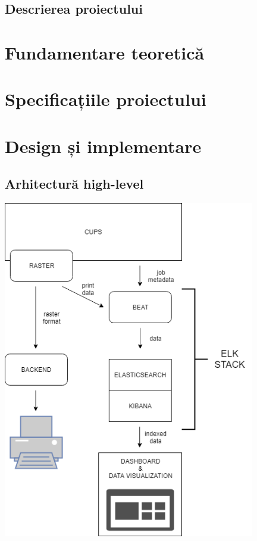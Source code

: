 \documentclass[12pt]{report}
\begin{document}
	\section{Descrierea proiectului}



\chapter{Fundamentare teoretică}


\chapter{Specificațiile proiectului}


\chapter{Design și implementare}

	\section{Arhitectură high-level}
		\begin{center}
			{\includegraphics[width=110mm]{cups-arch.png}}
		\end{center}
\end{document}
